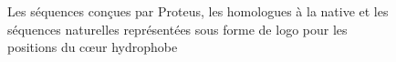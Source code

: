    \begin{figure}[!htbp]
     \caption{Les séquences conçues par Proteus, les homologues à la native et les séquences naturelles représentées sous forme de logo pour les positions du cœur hydrophobe}
\label{logo:corePDZ}
   \end{figure}

